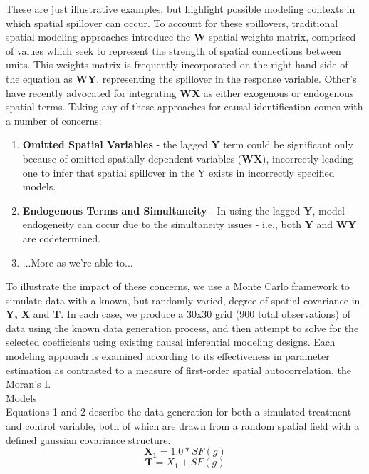 \documentclass[10pt,a3paper]{report}
\begin{document}
These are just illustrative examples, but highlight  possible modeling contexts in which spatial spillover can occur. To account for these spillovers, traditional spatial modeling approaches introduce the \textbf{W} spatial weights matrix, comprised of values which seek to represent the strength of spatial connections between units.  This weights matrix is frequently incorporated on the right hand side of the equation as \textbf{WY}, representing the spillover in the response variable.  Other's have recently advocated for integrating \textbf{WX} as either exogenous or endogenous spatial terms.  Taking any of these approaches for causal identification comes with a number of concerns:
\begin{enumerate}
\item \textbf{Omitted Spatial Variables} - the lagged \textbf{Y} term could be significant only because of omitted spatially dependent variables (\textbf{WX}), incorrectly leading one to infer that spatial spillover in the Y exists in incorrectly specified models. 

\item \textbf{Endogenous Terms and Simultaneity} - In using the lagged \textbf{Y}, model endogeneity can occur due to the simultaneity issues - i.e., both \textbf{Y} and \textbf{WY} are codetermined.

\item ...More as we're able to...

\end{enumerate}

To illustrate the impact of these concerns, we use a Monte Carlo framework to simulate data with a known, but randomly varied, degree of spatial covariance in \textbf{Y, X} and \textbf{T}.  In each case, we produce a 30x30 grid (900 total observations) of data using the known data generation process, and then attempt to solve for the selected coefficients using existing causal inferential modeling designs.  Each modeling approach is examined according to its effectiveness in parameter estimation as contrasted to a measure of first-order spatial autocorrelation, the Moran's I.\\

\underline{Models}\\
Equations 1 and 2 describe the data generation for both a simulated treatment and control variable, both of which are drawn from a random spatial field with a defined gaussian covariance structure.
\begin{equation}
\boldsymbol{X_{1}} = 1.0 * SF(g)
\end{equation}
\begin{equation}
\boldsymbol{T} = X_{1} + SF(g)
\end{equation}
\end{document}
